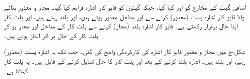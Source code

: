  اضافی گیٹ کے مخارج کو  اور  کہا گیا، جبکہ گیٹوں کو قابو کار اشارہ  فراہم کیا گیا۔ مجاز و معذور بنانے والا قابو کار اشارہ  پست (معذور) کرنے سے  اور  مداخل معذور ہوتے ہیں،  اور  بلند رہتے ہیں، اور پلٹ کار اپنا حال برقرار رکھتی ہے۔ قابو کار اشارہ بلند (مجاز) کرنے سے پلٹ کار کے مداخل  اور  مجاز ہو کر پلٹ کار کے حال پر اثر انداز ہوتے ہیں۔ 
 
 شکل-ج میں مجاز و معذور قابو کار اشارہ  کی کارکردگی واضح کی گئی۔ جب تک یہ اشارہ پست (معذور) رہے،  اور  بلند ہیں۔ اشارہ  بلند کرنے کے بعد  اور  پلٹ کار کا حال تبدیل کرنے کے قابل ہیں۔ یہ پلٹ کار  کہلاتا ہے۔
 
